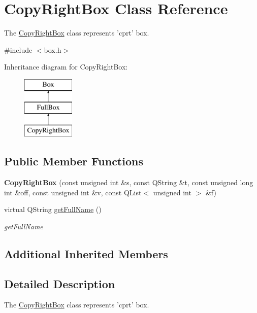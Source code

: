 \hypertarget{class_copy_right_box}{\section{Copy\-Right\-Box Class Reference}
\label{class_copy_right_box}
}


The \hyperlink{class_copy_right_box}{Copy\-Right\-Box} class represents 'cprt' box.  




{\ttfamily \#include $<$box.\-h$>$}

Inheritance diagram for Copy\-Right\-Box\-:\begin{figure}[H]
\begin{center}
\leavevmode
\includegraphics[height=3.000000cm]{class_copy_right_box}
\end{center}
\end{figure}
\subsection*{Public Member Functions}
\begin{DoxyCompactItemize}
\item 
\hypertarget{class_copy_right_box_a130cfb7dee18f0d2b78e39d679ba3000}{{\bfseries Copy\-Right\-Box} (const unsigned int \&s, const Q\-String \&t, const unsigned long int \&off, const unsigned int \&v, const Q\-List$<$ unsigned int $>$ \&f)}\label{class_copy_right_box_a130cfb7dee18f0d2b78e39d679ba3000}

\item 
virtual Q\-String \hyperlink{class_copy_right_box_a5aba245c42efd1c1c587a9a7ef1fc35c}{get\-Full\-Name} ()
\begin{DoxyCompactList}\small\item\em get\-Full\-Name \end{DoxyCompactList}\end{DoxyCompactItemize}
\subsection*{Additional Inherited Members}


\subsection{Detailed Description}
The \hyperlink{class_copy_right_box}{Copy\-Right\-Box} class represents 'cprt' box. 

